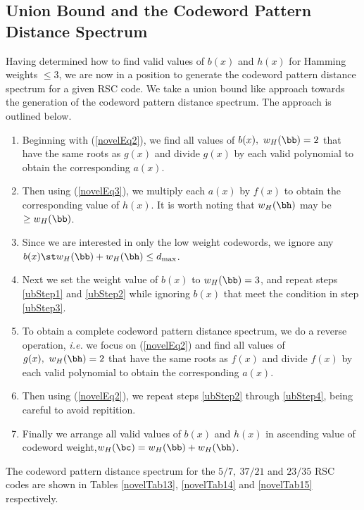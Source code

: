 \subsection{Union Bound and the Codeword Pattern Distance Spectrum}
Having determined how to find valid values of $b(x)$ and $h(x)$ for Hamming weights $\leq 3$, we are now in a position to generate the codeword pattern distance spectrum for a given RSC code. We take a union bound like approach towards the generation of the codeword pattern distance spectrum. The approach is outlined below.
\begin{enumerate}
 \item Beginning with (\ref{novelEq2}), we find all values of $b(x),~w_H(\bb)=2$ that have the same roots as $g(x)$ and divide $g(x)$ by each valid polynomial to obtain the corresponding $a(x)$.\label{ubStep1}
 \item Then using (\ref{novelEq3}), we multiply each $a(x)$ by $f(x)$ to obtain the corresponding value of $h(x)$. It is worth noting that $w_H(\bh)$ may be $\geq w_H(\bb)$. \label{ubStep2}
 \item Since we are interested in only the low weight codewords, we ignore any $b(x) \st w_H(\bb)+w_H(\bh) \leq d_{\text{max}}$. \label{ubStep3}
 \item Next we set the weight value of $b(x)$ to $w_H(\bb)=3$, and repeat steps \ref{ubStep1} and \ref{ubStep2} while ignoring $b(x)$ that meet the condition in step \ref{ubStep3}.\label{ubStep4}
 \item To obtain a complete codeword pattern distance spectrum, we do a reverse operation, \textit{i.e.} we focus on (\ref{novelEq2}) and find all values of $g(x),~w_H(\bh)=2$ that have the same roots as $f(x)$ and divide $f(x)$ by each valid polynomial to obtain the corresponding $a(x)$.
 \item Then using (\ref{novelEq2}), we repeat steps \ref{ubStep2} through \ref{ubStep4}, being careful to avoid repitition.
 \item Finally we arrange all valid values of $b(x)$ and $h(x)$ in ascending value of codeword weight,$w_H(\bc)=w_H(\bb) + w_H(\bh)$.
 \end{enumerate}
The codeword pattern distance spectrum for the $5/7,~37/21$ and $23/35$ RSC codes are shown in Tables \ref{novelTab13},  \ref{novelTab14} and \ref{novelTab15} respectively.

